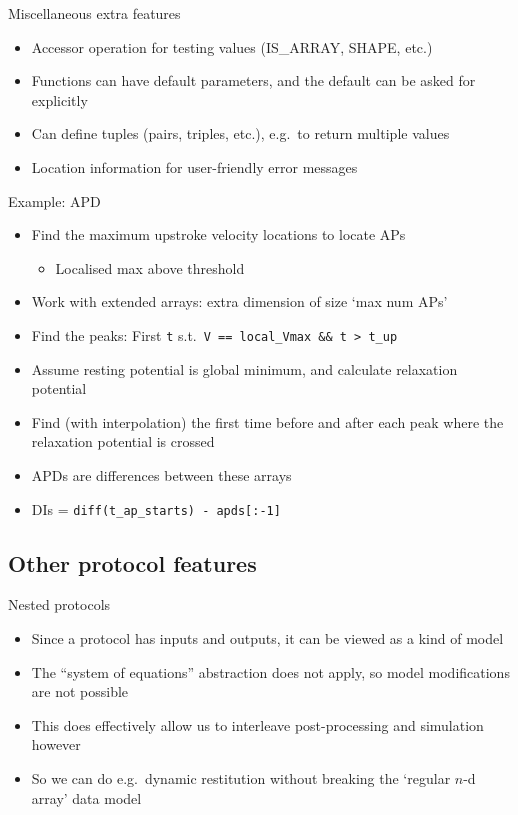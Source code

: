 \documentclass[t,xcolor={usenames,dvipsnames}]{beamer}
\newcommand{\subitem}[1]{\begin{itemize}[<.->]\item #1 \end{itemize}}
\begin{document}
\begin{frame}{Miscellaneous extra features}
\begin{itemize}
\item Accessor operation for testing values (IS\_ARRAY, SHAPE, etc.)
\item Functions can have default parameters, and the default can be asked for explicitly
\item Can define tuples (pairs, triples, etc.), e.g.\ to return multiple values
\item Location information for user-friendly error messages
\end{itemize}
\end{frame}

\begin{frame}{Example: APD}
\begin{itemize}
\item Find the maximum upstroke velocity locations to locate APs
  \subitem{Localised max above threshold}
\item Work with extended arrays: extra dimension of size `max num APs'
\item Find the peaks: First \texttt{t} s.t.\ \texttt{V == local\_Vmax \&\& t > t\_up}
\item Assume resting potential is global minimum, and calculate relaxation potential
\item Find (with interpolation) the first time before and after each peak where the relaxation potential is crossed
\item APDs are differences between these arrays
\item DIs = \texttt{diff(t\_ap\_starts) - apds[:-1]}
\end{itemize}
\end{frame}

\subsection{Other protocol features}

\begin{frame}{Nested protocols}
\begin{itemize}
\item Since a protocol has inputs and outputs, it can be viewed as a kind of model
\item The ``system of equations'' abstraction does not apply, so model modifications are not possible
\item This does effectively allow us to interleave post-processing and simulation however
\item So we can do e.g.\ dynamic restitution without breaking the `regular $n$-d array' data model
\end{itemize}
\end{frame}
\end{document}
